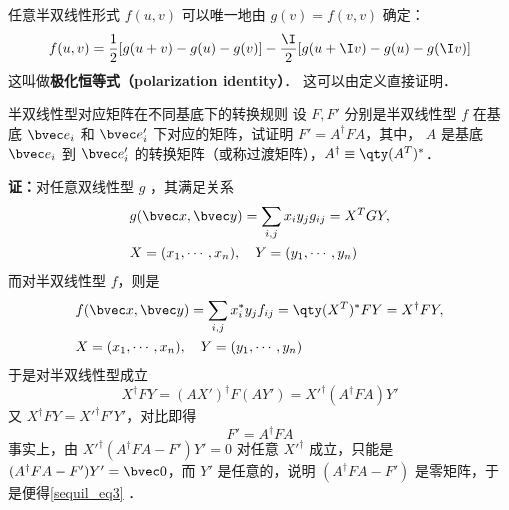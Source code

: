 任意半双线性形式 $f(u, v)$ 可以唯一地由 $g(v) = f(v, v)$ 确定：
\begin{equation}
f(u, v) =\frac{1}{2}[g(u+v)-g(u)-g(v)]
-\frac{\I}{2}[g(u+\I v)-g(u)-g(\I v)]
\end{equation}
这叫做\textbf{极化恒等式（polarization identity）}． 这可以由定义直接证明．
\begin{example}{半双线性型对应矩阵在不同基底下的转换规则}\label{sequil_ex1}
设 $F,F'$ 分别是半双线性型 $f$ 在基底 $\bvec e_i$ 和 $\bvec e'_i$ 下对应的矩阵，试证明 $F'=A^\dagger FA$，其中， $A$ 是基底 $\bvec e_i$ 到 $\bvec e'_i$ 的转换矩阵（或称过渡矩阵），$A^\dagger\equiv\qty(A^{T})^*$．

\textbf{证：}对任意双线性型 $g$ ，其满足关系
\begin{equation}
\begin{aligned}
&g(\bvec x,\bvec y)=\sum_{i,j}x_i y_j g_{ij}=X^TGY,\\
&X=(x_1,\cdots,x_n),\quad Y=(y_1,\cdots,y_n)
\end{aligned}
\end{equation}
而对半双线性型 $f$，则是
\begin{equation}
\begin{aligned}
&f(\bvec x,\bvec y)=\sum_{i,j}x_i^* y_j f_{ij}=\qty(X^T)^*FY=X^\dagger FY,\\
&X=(x_1,\cdots,x_n),\quad Y=(y_1,\cdots,y_n)
\end{aligned}
\end{equation}
于是对半双线性型成立
\begin{equation}
X^\dagger FY=(AX')^\dagger F(AY')={X'}^\dagger(A^\dagger FA)Y'
\end{equation}
又 $X^\dagger F Y=X'^\dagger F'Y'$，对比即得
\begin{equation}\label{sequil_eq3}
F'=A^\dagger F A
\end{equation}
事实上，由 ${X'}^\dagger(A^\dagger FA-F')Y'=0$ 对任意 $X'^\dagger$ 成立，只能是 $(A^\dagger FA-F')Y'=\bvec 0$，而 $Y'$ 是任意的，说明 $(A^\dagger FA-F')$ 是零矩阵，于是便得\autoref{sequil_eq3} ．
\end{example}